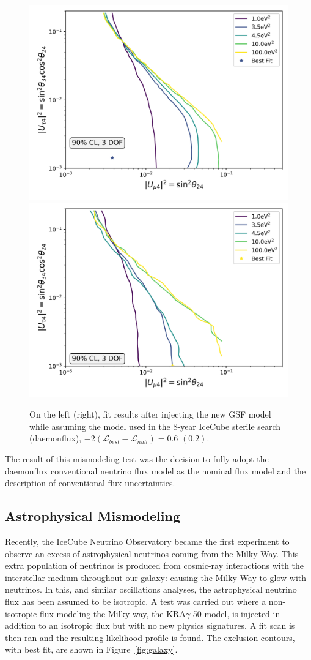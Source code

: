 \documentclass[main.tex]{subfiles}
\begin{document}
\begin{figure}  
    \centering
    \includegraphics[width=0.45\linewidth]{figures/gsfinject_fitbarr_Realization_gsfdaemon_Asimov_sterile_0_cl0.9_dof3.png}
    \includegraphics[width=0.45\linewidth]{figures/gsfinject_fitdaemon_Realization_gsfdaemon_Asimov_sterile_0_cl0.9_dof3.png}
    \caption{On the left (right), fit results after injecting the new GSF model while assuming the model used in the 8-year IceCube sterile search (daemonflux), $-2(\mathcal{L}_{best}-\mathcal{L}_{null})=0.6$ $(0.2)$.}\label{fig:gsf_updates}
\end{figure}

The result of this mismodeling test was the decision to fully adopt the daemonflux conventional neutrino flux model as the nominal flux model and the description of conventional flux uncertainties. 

\subsection{Astrophysical Mismodeling}

Recently, the IceCube Neutrino Observatory became the first experiment to observe an excess of astrophysical neutrinos coming from the Milky Way\cite{doi:10.1126/science.adc9818}. 
This extra population of neutrinos is produced from cosmic-ray interactions with the interstellar medium throughout our galaxy: causing the Milky Way to glow with neutrinos. 
In this, and similar oscillations analyses, the astrophysical neutrino flux has been assumed to be isotropic. 
A test was carried out where a non-isotropic flux modeling the Milky way, the KRA$\gamma$-50\cite{Gaggero_2015} model, is injected in addition to an isotropic flux but with no new physics signatures. 
A fit scan is then ran and the resulting likelihood profile is found. 
The exclusion contours, with best fit, are shown in Figure~\ref{fig:galaxy}.
\end{document}
